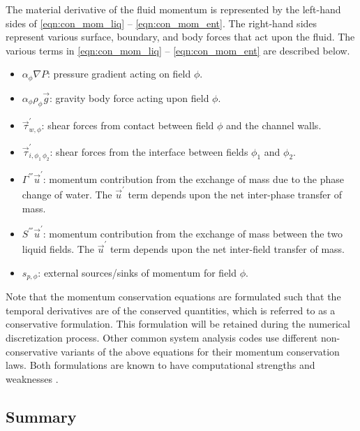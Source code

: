 The material derivative of the fluid momentum is represented by the left-hand sides of \eqref{eqn:con_mom_liq} -- \eqref{eqn:con_mom_ent}.
The right-hand sides represent various surface, boundary, and body forces that act upon the fluid.
The various terms in \eqref{eqn:con_mom_liq} -- \eqref{eqn:con_mom_ent} are described below.

\begin{itemize}
\item{
$\alpha_{\phi} \nabla P$:
pressure gradient acting on field $\phi$.
}
\item{
$\alpha_{\phi} \rho_{\phi} \vec{g}$:
gravity body force acting upon field $\phi$.
}
\item{
$\vec{\tau}^{'}_{w,\phi}$:
 shear forces from contact between field $\phi$ and the channel walls. 
}
\item{
$\vec{\tau}^{'}_{i,\phi_1\,\phi_2}$:
 shear forces from the interface between fields $\phi_1$ and $\phi_2$. 
}
\item{
$\Gamma^{'''}\vec{u}^{'}$:
 momentum contribution from the exchange of mass due to the phase change of water.
 The $\vec{u}^{'}$ term depends upon the net inter-phase transfer of mass.
}
\item{
$S^{'''}\vec{u}^{'}$:
 momentum contribution from the exchange of mass between the two liquid fields.
 The $\vec{u}^{'}$ term depends upon the net inter-field transfer of mass.
}
\item{
$s_{p,\phi}$:
 external sources/sinks of momentum for field $\phi$.
}
\end{itemize}

Note that the momentum conservation equations are formulated such that the temporal derivatives are of the conserved quantities, which is referred to as a conservative formulation.
This formulation will be retained during the numerical discretization process.
Other common system analysis codes \cite{TRACE, RELAP} use different non-conservative variants of the above equations for their momentum conservation laws.
Both formulations are known to have computational strengths and weaknesses \cite{Park2009a}.

\subsection{Summary}
\label{subsect:summary}

